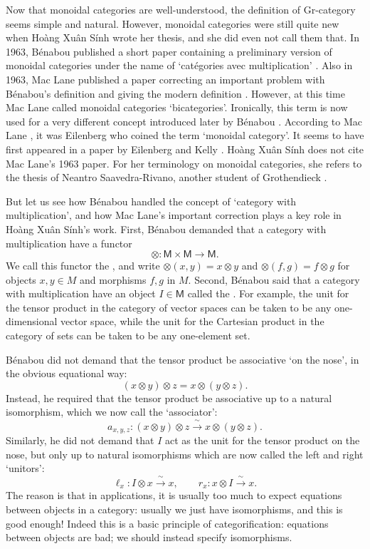 \documentclass[reqno,12pt]{amsart}
\newcommand{\maps}{\colon}    %
\newcommand{\M}{{\mathsf{M}}}   %
\newcommand{\define}[1]{\textbf{\boldmath{#1}}}
\theoremstyle{definition}
\begin{document}
Now that monoidal categories are well-understood, the definition of Gr-category seems simple and natural.   However, monoidal categories were still quite new when Ho\`ang Xu\^an S\'inh wrote her thesis, and she did even not call them that.  In 1963, B\'enabou published a short paper containing a preliminary version of monoidal categories under the name of `cat\'egories avec multiplication' \cite{B63}.   Also in 1963, Mac Lane published a paper correcting an important problem with B\'enabou's definition and giving the modern definition  \cite{M63}.  However, at this time Mac Lane called monoidal categories `bicategories'.  Ironically, this term is now used for a very different concept introduced later by B\'enabou \cite{B67}.   According to Mac Lane \cite{M13}, it was Eilenberg who coined the term `monoidal category'.  It seems to have first appeared in a paper by Eilenberg and Kelly \cite{EK}.   Ho\`ang Xu\^an S\'inh does not cite Mac Lane's 1963 paper.  For her terminology on monoidal categories, she refers to the thesis of Neantro Saavedra-Rivano, another student of Grothendieck \cite{SR70,SR72}.

But let us see how B\'enabou handled the concept of `category with multiplication', and how Mac Lane's important correction plays a key role in Ho\`ang Xu\^an S\'inh's work.   First, B\'enabou demanded that a category with multiplication have a functor
\[           \otimes \colon \M \times \M \to \M. \]
We call this functor the \define{tensor product}, and write $\otimes(x,y)=x \otimes y$ and $\otimes(f,g)=f \otimes g$
for objects $x, y \in M$ and morphisms $f, g$ in $M$.  Second, B\'enabou said that a category with multiplication have an object $I \in \M$ called the \define{unit}.  For example, the unit for the tensor product in the category of vector spaces can be taken to be any one-dimensional vector space, while the unit for the Cartesian product in the category of sets can be taken to be any one-element set.  

B\'enabou did not demand that the tensor product be
associative `on the nose', in the obvious equational way:
\[         (x \otimes y) \otimes z = x \otimes (y \otimes z) .\]
Instead, he required that the tensor product be associative up to a natural isomorphism, which we now call the `associator':
\[     a_{x,y,z} \maps (x \otimes y) \otimes z \xrightarrow{\;\sim\;} x \otimes (y \otimes z)  .\]
Similarly, he did not demand that $I$ act as the unit for
the tensor product on the nose, but only up to natural isomorphisms
which are now called the left and right `unitors':
\[       \ell_x \maps I \otimes x \xrightarrow{\;\sim\;} x  , \qquad
            r_x \maps x \otimes I \xrightarrow{\;\sim\;} x  .\]
The reason is that in applications, it is usually too much to
expect equations between objects in a category: usually we just
have isomorphisms, and this is good enough!  Indeed this is a
basic principle of categorification: equations between objects are
bad; we should instead specify isomorphisms.
\end{document}
